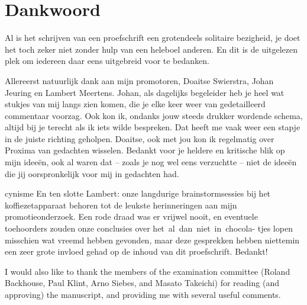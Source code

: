 \chapter*{Dankwoord}
\label{chap:dank}



Al is het schrijven van een proefschrift een grotendeels solitaire bezigheid, je doet het toch zeker niet zonder hulp van een heleboel anderen. En dit is de uitgelezen plek om iedereen daar eens uitgebreid voor te bedanken.

Allereerst natuurlijk dank aan mijn promotoren, Doaitse Swierstra, Johan Jeuring en Lambert Meertens. Johan, als dagelijks begeleider heb je heel wat stukjes van mij langs zien komen, die je elke keer  weer van gedetailleerd commentaar voorzag. Ook kon ik, ondanks jouw steeds drukker wordende schema, altijd bij je terecht als ik iets wilde bespreken. Dat heeft me vaak weer een stapje in de juiste richting geholpen. Doaitse, ook met jou kon ik regelmatig over Proxima van gedachten wisselen. Bedankt voor je heldere en kritische blik op mijn idee\"en, ook al waren dat -- zoals je nog wel eens verzuchtte -- niet de idee\"en die jij oorspronkelijk voor mij in gedachten had.

\bc cynisme \ec 
En ten slotte Lambert: onze langdurige brainstormsessies bij het koffiezetapparaat behoren tot de leukste herinneringen aan mijn promotieonderzoek. Een rode draad was er vrijwel nooit, en eventuele toehoorders zouden onze conclusies over het~al~dan~niet~in~chocola- tjes lopen misschien wat vreemd hebben gevonden, maar deze gesprekken hebben niettemin een zeer grote invloed gehad op de inhoud van dit proefschrift. Bedankt!


I would also like to thank the members of the examination committee (Roland Backhouse, Paul Klint, Arno Siebes, and Masato Takeichi) for reading (and approving) the manuscript, and providing me with several useful comments.

